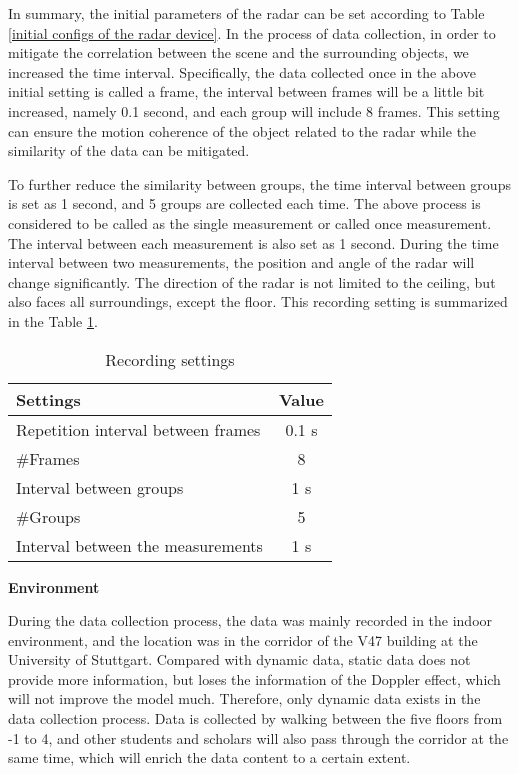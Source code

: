 In summary, the initial parameters of the radar can be set according to Table \ref{initial configs of the radar device}. In the process of data collection, in order to mitigate the correlation between the scene and the surrounding objects, we increased the time interval. Specifically, the data collected once in the above initial setting is called a frame, the interval between frames will be a little bit increased, namely 0.1 second, and each group will include 8 frames. This setting can ensure the motion coherence of the object related to the radar while the similarity of the data can be mitigated.

To further reduce the similarity between groups, the time interval between groups is set as 1 second, and 5 groups are collected each time. The above process is considered to be called as the single measurement or called once measurement. The interval between each measurement is also set as 1 second. During the time interval between two measurements, the position and angle of the radar will change significantly. The direction of the radar is not limited to the ceiling, but also faces all surroundings, except the floor. This recording setting is summarized in the Table \ref{recording settings}.

\begin{table}
    \centering
    \caption{Recording settings}
    \label{recording settings}
    \begin{tabular}{l|c}
        \hline
        \textbf{Settings} & \textbf{Value} \\
        \hline
        Repetition interval between frames & 0.1 s \\
        \hline
        \#Frames & 8 \\
        \hline
        Interval between groups & 1 s \\
        \hline
        \#Groups & 5 \\
        \hline
        Interval between the measurements  & 1 s \\
        \hline
    \end{tabular}
\end{table}

\begin{spacing}{1.5}
\textbf{\large{Environment}}
\end{spacing}

During the data collection process, the data was mainly recorded in the indoor environment, and the location was in the corridor of the V47 building at the University of Stuttgart. Compared with dynamic data, static data does not provide more information, but loses the information of the Doppler effect, which will not improve the model much. Therefore, only dynamic data exists in the data collection process. Data is collected by walking between the five floors from -1 to 4, and other students and scholars will also pass through the corridor at the same time, which will enrich the data content to a certain extent.

